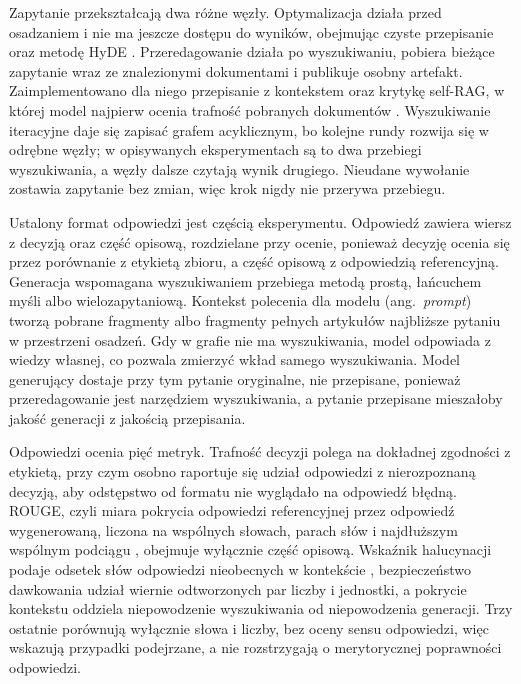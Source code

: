 Zapytanie przekształcają dwa różne węzły. Optymalizacja działa przed osadzaniem i nie ma jeszcze
dostępu do wyników, obejmując czyste przepisanie oraz metodę HyDE \cite{gao2023hyde}.
Przeredagowanie działa po wyszukiwaniu, pobiera bieżące zapytanie wraz ze znalezionymi dokumentami
i publikuje osobny artefakt. Zaimplementowano dla niego przepisanie z kontekstem oraz krytykę
self-RAG, w której model najpierw ocenia trafność pobranych dokumentów \cite{asai2024selfrag}.
Wyszukiwanie iteracyjne daje się zapisać grafem acyklicznym, bo kolejne rundy rozwija się w
odrębne węzły; w opisywanych eksperymentach są to dwa przebiegi wyszukiwania, a węzły dalsze
czytają wynik drugiego. Nieudane wywołanie zostawia zapytanie bez zmian, więc krok nigdy nie
przerywa przebiegu.

Ustalony format odpowiedzi jest częścią eksperymentu. Odpowiedź zawiera wiersz z decyzją oraz
część opisową, rozdzielane przy ocenie, ponieważ decyzję ocenia się przez porównanie z etykietą
zbioru, a część opisową z odpowiedzią referencyjną. Generacja wspomagana wyszukiwaniem
\cite{lewis2020retrieval, shuster2021retrieval} przebiega metodą prostą, łańcuchem myśli albo
wielozapytaniową. Kontekst polecenia dla modelu (ang.\ \textit{prompt}) tworzą pobrane fragmenty
albo fragmenty pełnych artykułów najbliższe pytaniu w przestrzeni osadzeń. Gdy w grafie nie ma
wyszukiwania, model odpowiada z wiedzy własnej, co pozwala zmierzyć wkład samego wyszukiwania.
Model generujący dostaje przy tym pytanie oryginalne, nie przepisane, ponieważ przeredagowanie
jest narzędziem wyszukiwania, a pytanie przepisane mieszałoby jakość generacji z jakością
przepisania.

Odpowiedzi ocenia pięć metryk. Trafność decyzji polega na dokładnej zgodności z etykietą, przy
czym osobno raportuje się udział odpowiedzi z nierozpoznaną decyzją, aby odstępstwo od formatu nie
wyglądało na odpowiedź błędną. ROUGE, czyli miara pokrycia odpowiedzi referencyjnej przez
odpowiedź wygenerowaną, liczona na wspólnych słowach, parach słów i najdłuższym wspólnym podciągu
\cite{lin2004rouge}, obejmuje wyłącznie część opisową. Wskaźnik halucynacji podaje odsetek słów
odpowiedzi
nieobecnych w kontekście \cite{ji2023survey}, bezpieczeństwo dawkowania udział wiernie
odtworzonych par liczby i jednostki, a pokrycie kontekstu oddziela niepowodzenie wyszukiwania od
niepowodzenia generacji. Trzy ostatnie porównują wyłącznie słowa i liczby, bez oceny sensu
odpowiedzi, więc wskazują przypadki podejrzane, a nie rozstrzygają o merytorycznej poprawności
odpowiedzi.

